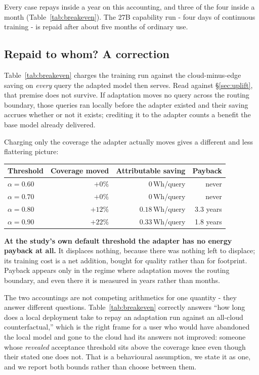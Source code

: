 \documentclass[conference]{IEEEtran}
\newcommand{\Wh}{\,\text{Wh}}
\begin{document}
Every case repays inside a year on this accounting, and three of the four inside
a month (Table~\ref{tab:breakeven}). The 27B capability run - four days of
continuous training - is repaid after about five months of ordinary use.

\subsection{Repaid to whom? A correction}
\label{sec:whorepays}
Table~\ref{tab:breakeven} charges the training run against the cloud-minus-edge
saving on \emph{every} query the adapted model then serves. Read against
\S\ref{sec:uplift}, that premise does not survive. If adaptation moves no query
across the routing boundary, those queries ran locally before the adapter
existed and their saving accrues whether or not it exists; crediting it to the
adapter counts a benefit the base model already delivered.

Charging only the coverage the adapter actually moves gives a different and
less flattering picture:

\begin{center}\small
\begin{tabular}{lrrr}
\toprule
Threshold & Coverage moved & Attributable saving & Payback \\
\midrule
$\alpha = 0.60$ & $+0\%$ & $0\Wh$/query & never \\
$\alpha = 0.70$ & $+0\%$ & $0\Wh$/query & never \\
$\alpha = 0.80$ & $+12\%$ & $0.18\Wh$/query & 3.3 years \\
$\alpha = 0.90$ & $+22\%$ & $0.33\Wh$/query & 1.8 years \\
\bottomrule
\end{tabular}
\end{center}

\noindent \textbf{At the study's own default threshold the adapter has no
energy payback at all.} It displaces nothing, because there was nothing left to
displace; its training cost is a net addition, bought for quality rather than
for footprint. Payback appears only in the regime where adaptation moves the
routing boundary, and even there it is measured in years rather than months.

The two accountings are not competing arithmetics for one quantity - they
answer different questions. Table~\ref{tab:breakeven} correctly answers ``how
long does a local deployment take to repay an adaptation run against an
all-cloud counterfactual,'' which is the right frame for a user who would have
abandoned the local model and gone to the cloud had its answers not improved:
someone whose \emph{revealed} acceptance threshold sits above the coverage knee
even though their stated one does not. That is a behavioural assumption, we
state it as one, and we report both bounds rather than choose between them.
\end{document}
